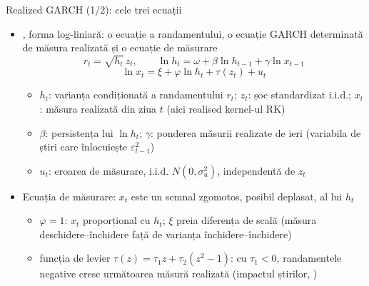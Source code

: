 \begin{frame}{Realized GARCH (1/2): cele trei ecuații}
\itemsize{\footnotesize}
\begin{itemize}
    \item {}, forma log-liniară: o ecuație a randamentului, o ecuație GARCH determinată de măsura realizată și o ecuație de măsurare
    \[ r_t = \sqrt{h_t}\,z_t, \qquad \ln h_t = \omega + \beta\ln h_{t-1} + \gamma\ln x_{t-1} \]
    \[ \ln x_t = \xi + \varphi\ln h_t + \tau(z_t) + u_t \]
    \begin{itemize}
        \item $h_t$: varianța condiționată a randamentului $r_t$; $z_t$: șoc standardizat i.i.d.; $x_t$: măsura realizată din ziua $t$ (aici realised kernel-ul RK)
        \item $\beta$: persistența lui $\ln h_t$; $\gamma$: ponderea măsurii realizate de ieri (variabila de știri care înlocuiește $\varepsilon^2_{t-1}$)
        \item $u_t$: eroarea de măsurare, i.i.d. $N(0, \sigma^2_u)$, independentă de $z_t$
    \end{itemize}
    \item Ecuația de măsurare: $x_t$ este un semnal zgomotos, posibil deplasat, al lui $h_t$
    \begin{itemize}
        \item $\varphi = 1$: $x_t$ proporțional cu $h_t$; $\xi$ preia diferența de scală (măsura deschidere--închidere față de varianța închidere--închidere)
        \item funcția de levier $\tau(z) = \tau_1z + \tau_2(z^2 - 1)$: cu $\tau_1 < 0$, randamentele negative cresc următoarea măsură realizată (impactul știrilor, )
    \end{itemize}
\end{itemize}
\end{frame}


